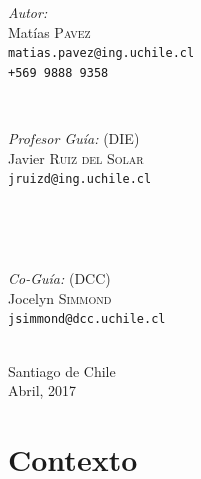 \documentclass[12pt,letterpaper,spanish]{article}
\begin{document}
\begin{titlepage}
\begin{minipage}{0.4\textwidth}
\begin{flushleft} \large
\emph{Autor:}\\
Mat\'ias \textsc{Pavez}\\
\texttt{\normalsize matias.pavez@ing.uchile.cl} \\
\texttt{\normalsize +569 9888 9358}
\end{flushleft}
\end{minipage}
~
\begin{minipage}{0.4\textwidth}
\begin{flushright} \large
\emph{Profesor Gu\'ia:} (DIE) \\
Javier \textsc{Ruiz del Solar}\\
\texttt{\normalsize jruizd@ing.uchile.cl}
\end{flushright}
\end{minipage}\\[1cm]
\begin{minipage}{0.4\textwidth}
\begin{flushleft}\end{flushleft}
\end{minipage}
~
\begin{minipage}{0.4\textwidth}
\begin{flushright} \large
\emph{Co-Gu\'ia:} (DCC)\\
Jocelyn \textsc{Simmond}\\
\texttt{\normalsize jsimmond@dcc.uchile.cl}
\end{flushright}
\end{minipage}\\[2.5cm]
{\large Santiago de Chile}\\
{\large Abril, 2017}
\vfill
 
\end{titlepage}


\section{Contexto}

\end{document}
